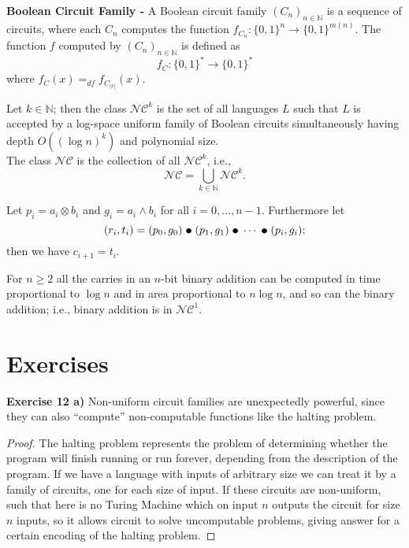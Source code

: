 \documentclass[a4paper]{article}
\begin{document}
\begin{definition}
\textbf{Boolean Circuit Family -} A Boolean circuit family $(C_{n})_{n \in \mathbb{N}}$ is a sequence of circuits, where each $C_{n}$ computes the function $f_{C_{n}}: \{ 0, 1 \}^{n} \rightarrow \{ 0, 1 \}^{m(n)}$. The function $f$ computed by $(C_{n})_{n \in \mathbb{N}}$ is defined as
$$f_{C}: \{ 0, 1 \}^{*} \rightarrow \{ 0, 1 \}^{*}$$
where $f_{C}(x) =_{df} f_{C_{|x|}}(x)$.
\end{definition}


\begin{samepage}
\begin{definition}
Let $k \in \mathbb{N}$; then the class $\mathcal{N}\mathcal{C}^{k}$ is the set of all languages $L$ such that $L$ is accepted by a log-space uniform family of Boolean circuits simultaneously having depth $O((\log{n})^{k})$ and polynomial size. \\
The class $\mathcal{N}\mathcal{C}$ is the collection of all $\mathcal{N}\mathcal{C}^{k}$, i.e.,
$$\mathcal{N}\mathcal{C} = \bigcup\limits_{k \in \mathbb{N}} \mathcal{N}\mathcal{C}^{k}.$$
\end{definition}
\end{samepage}


\begin{theorem}
Let $p_{i} = a_{i} \otimes b_{i}$ and $g_{i} = a_{i} \land b_{i}$ for all $i = 0, \ldots, n - 1$. Furthermore let
$$(r_{i}, t_{i}) = (p_{0}, g_{0})\ \tikz\draw[black,fill=black] (0,0) circle (.5ex);\ (p_{1}, g_{1})\ \tikz\draw[black,fill=black] (0,0) circle (.5ex);\ \cdots\ \tikz\draw[black,fill=black] (0,0) circle (.5ex);\ (p_{i}, g_{i});$$
then we have $c_{i + 1} = t_{i}$.
\end{theorem}


\begin{theorem}
For $n \geq 2$ all the carries in an $n$-bit binary addition can be computed in time proportional to $\log{n}$ and in area proportional to $n \log{n}$, and so can the binary addition; i.e., binary addition is in $\mathcal{N}\mathcal{C}^{1}$.
\end{theorem}



\section{Exercises}
\noindent \textbf{Exercise 12 a)}  Non-uniform circuit families are unexpectedly powerful, since they can also “compute” non-computable functions like the halting problem.
\begin{proof}
The halting problem represents the problem of determining whether the program will finish running or run forever, depending from the description of the program. If we have a language with inputs of arbitrary size we can treat it by a family of circuits, one for each size of input. If these circuits are non-uniform, such that here is no Turing Machine which on input $n$ outputs the circuit for size $n$ inputs, so it allows circuit to solve uncomputable problems, giving answer for a certain encoding of the halting problem.
\end{proof}
\end{document}
